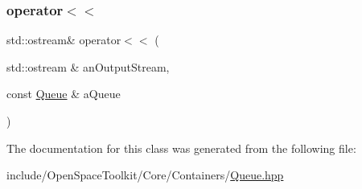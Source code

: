 \subsubsection{\texorpdfstring{operator$<$$<$}{operator<<}}
{\footnotesize\ttfamily std\+::ostream\& operator$<$$<$ (\begin{DoxyParamCaption}\item[{std\+::ostream \&}]{an\+Output\+Stream,  }\item[{const \hyperlink{classostk_1_1core_1_1ctnr_1_1_queue}{Queue} \&}]{a\+Queue }\end{DoxyParamCaption})\hspace{0.3cm}{\ttfamily [friend]}}



The documentation for this class was generated from the following file\+:\begin{DoxyCompactItemize}
\item 
include/\+Open\+Space\+Toolkit/\+Core/\+Containers/\hyperlink{_queue_8hpp}{Queue.\+hpp}\end{DoxyCompactItemize}
